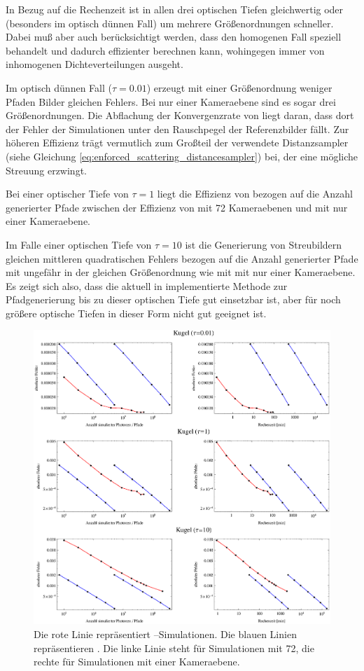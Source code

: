 	In Bezug auf die Rechenzeit ist \pirate in allen drei optischen Tiefen gleichwertig oder (besonders im optisch dünnen Fall) um mehrere Größenordnungen schneller. Dabei muß aber auch berücksichtigt werden, dass \pirate den homogenen Fall speziell behandelt und dadurch effizienter berechnen kann, wohingegen \mctd immer von inhomogenen Dichteverteilungen ausgeht.
	
	Im optisch dünnen Fall ($\tau=0.01$) erzeugt \pirate mit einer Größenordnung weniger Pfaden Bilder gleichen Fehlers. Bei nur einer Kameraebene sind es sogar drei Größenordnungen. Die Abflachung der Konvergenzrate von \pirate liegt daran, dass dort der Fehler der Simulationen unter den Rauschpegel der Referenzbilder fällt. Zur höheren Effizienz trägt vermutlich zum Großteil der verwendete Distanzsampler (siehe Gleichung \ref{eq:enforced_scattering_distancesampler}) bei, der eine mögliche Streuung erzwingt.
	
	Bei einer optischer Tiefe von $\tau=1$ liegt die Effizienz von \pirate bezogen auf die Anzahl generierter Pfade zwischen der Effizienz von \mctd mit 72 Kameraebenen und \mctd mit nur einer Kameraebene.
	
	Im Falle einer optischen Tiefe von $\tau=10$ ist die Generierung von Streubildern gleichen mittleren quadratischen Fehlers bezogen auf die Anzahl generierter Pfade mit \pirate ungefähr in der gleichen Größenordnung wie mit \mctd mit nur einer Kameraebene. Es zeigt sich also, dass die aktuell in \pirate implementierte Methode zur Pfadgenerierung bis zu dieser optischen Tiefe gut einsetzbar ist, aber für noch größere optische Tiefen in dieser Form nicht gut geeignet ist.

		\begin{figure}
			\centering
			\includegraphics[width=1.0\textwidth]{sphereerrorplots.eps}
			\caption{Die rote Linie repräsentiert \pirate--Simulationen. Die blauen Linien repräsentieren \mctd. Die linke Linie steht für Simulationen mit 72, die rechte für Simulationen mit einer Kameraebene.}
			\label{fig:sphere_errors}
		\end{figure}


